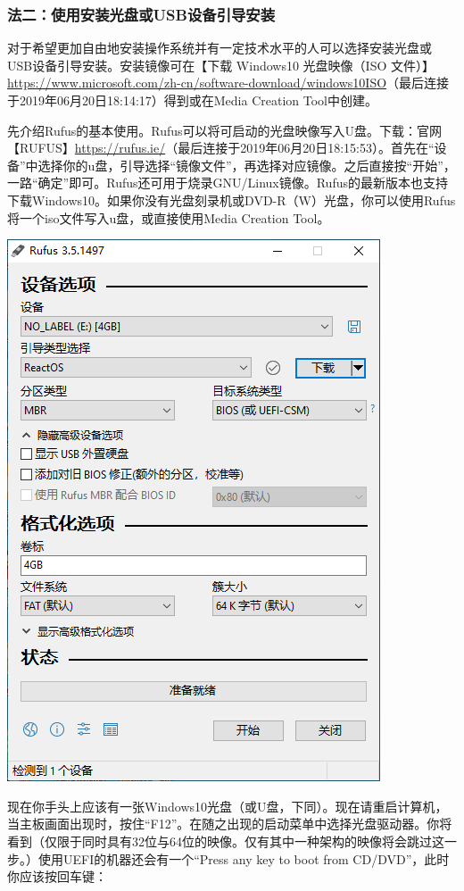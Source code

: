 \subsubsection{法二：使用安装光盘或USB设备引导安装}
对于希望更加自由地安装操作系统并有一定技术水平的人可以选择安装光盘或USB设备引导安装。安装镜像可在【下载 Windows10 光盘映像（ISO 文件）】\url{https://www.microsoft.com/zh-cn/software-download/windows10ISO}（最后连接于2019年06月20日18:14:17）得到或在Media Creation Tool中创建。\par
先介绍Rufus的基本使用。Rufus可以将可启动的光盘映像写入U盘。下载：官网【RUFUS】\url{https://rufus.ie/}（最后连接于2019年06月20日18:15:53）。首先在“设备”中选择你的u盘，引导选择“镜像文件”，再选择对应镜像。之后直接按“开始”，一路“确定”即可。Rufus还可用于烧录GNU/Linux镜像。Rufus的最新版本也支持下载Windows10。如果你没有光盘刻录机或DVD-R（W）光盘，你可以使用Rufus将一个iso文件写入u盘，或直接使用Media Creation Tool。
\begin{center}
	\includegraphics[scale=0.4]{pic/Rufus}	
\end{center} \par
现在你手头上应该有一张Windows10光盘（或U盘，下同）。现在请重启计算机，当主板画面出现时，按住“F12”。在随之出现的启动菜单中选择光盘驱动器。你将看到（仅限于同时具有32位与64位的映像。仅有其中一种架构的映像将会跳过这一步。）使用UEFI的机器还会有一个“Press any key to boot from CD/DVD”，此时你应该按回车键：
